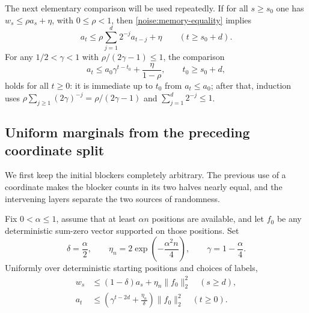 The next elementary comparison will be used repeatedly. If for all
$s\ge s_0$ one has $w_s\le\rho a_s+\eta$, with $0\le\rho<1$, then
\eqref{noise:memory-equality} implies
\begin{equation}
 a_t\le\rho\sum_{j=1}^d2^{-j}a_{t-j}+\eta
 \qquad(t\ge s_0+d).
 \label{noise:comparison-recurrence}
\end{equation}
For any $1/2<\gamma<1$ with $\rho/(2\gamma-1)\le1$, the comparison
\begin{equation}
 a_t\le a_0\gamma^{t-t_0}+\frac{\eta}{1-\rho},
 \qquad t_0\ge s_0+d,
 \label{noise:comparison-solution}
\end{equation}
holds for all $t\ge0$: it is immediate up to $t_0$ from $a_t\le a_0$;
after that, induction uses
$\rho\sum_{j\ge1}(2\gamma)^{-j}=\rho/(2\gamma-1)$ and
$\sum_{j=1}^d2^{-j}\le1$.

\subsection{Uniform marginals from the preceding coordinate split}

We first keep the initial blockers completely arbitrary. The previous
use of a coordinate makes the blocker counts in its two halves nearly
equal, and the intervening layers separate the two sources of randomness.

\begin{lemma}
\label{noise:halves}
Fix $0<\alpha\le1$, assume that at least $\alpha n$ positions are
available, and let $f_0$ be any deterministic sum-zero vector supported
on those positions. Set
\[
 \delta=\frac\alpha2,\qquad
 \eta_n=2\exp\!\left(-\frac{\alpha^2n}{4}\right),\qquad
 \gamma=1-\frac\alpha4.
\]
Uniformly over deterministic starting positions and choices of labels,
\begin{equation}
 \begin{split}
 w_s&\le(1-\delta)a_s+\eta_n\|f_0\|_2^2\quad(s\ge d),\\
 a_t&\le\left(\gamma^{t-2d}+\frac{\eta_n}{\delta}\right)
                  \|f_0\|_2^2\quad(t\ge0).
 \end{split}
 \label{noise:half-energy}
\end{equation}
\end{lemma}

